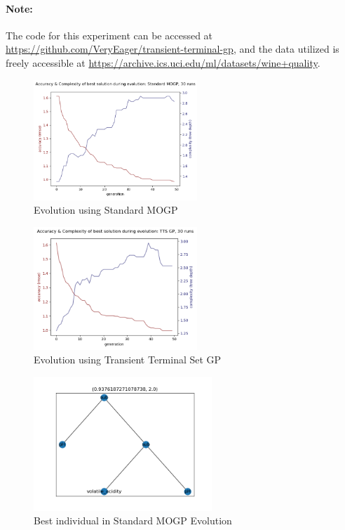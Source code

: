\documentclass[a4paper]{article}
\begin{document}
\paragraph{Note:} The code for this experiment can be accessed at \url{https://github.com/VeryEager/transient-terminal-gp}, and the data utilized is freely accessible at \url{https://archive.ics.uci.edu/ml/datasets/wine+quality}.
\begin{figure}[H]
	\caption{Evolution using Standard MOGP}
	\centering
	\includegraphics[width=0.55\textwidth]{Figure_1}
\end{figure}
\begin{figure}[H]
	\caption{Evolution using Transient Terminal Set GP}
	\centering
	\includegraphics[width=0.55\textwidth]{Figure_3}
\end{figure}
\begin{figure}[H]
	\caption{Best individual in Standard MOGP Evolution}
	\centering
	\includegraphics[width=0.6\textwidth]{Figure_2}
\end{figure}
\end{document}
